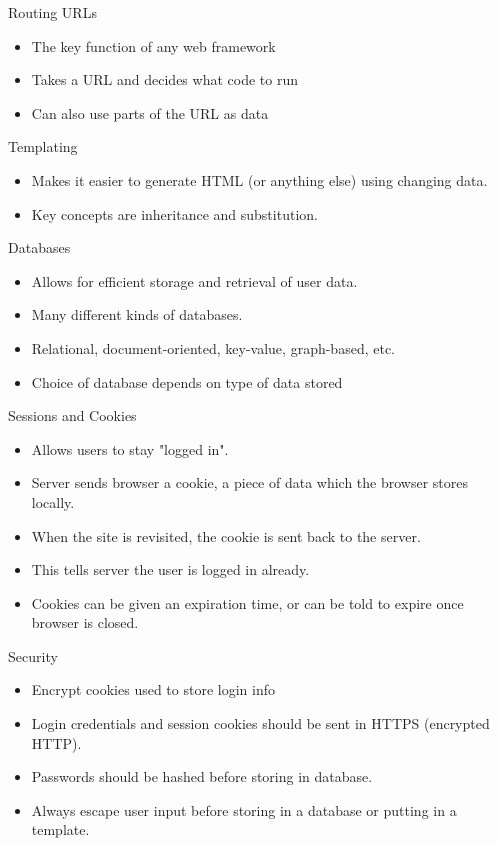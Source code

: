 \documentclass{beamer}
\begin{document}
\begin{frame}{Routing URLs}
	\begin{itemize}
		\item The key function of any web framework
		\item Takes a URL and decides what code to run
		\item Can also use parts of the URL as data
	\end{itemize}
\end{frame}

\begin{frame}{Templating}
	\begin{itemize}
		\item Makes it easier to generate HTML (or anything else) using
			changing data.
		\item Key concepts are inheritance and substitution.
	\end{itemize}
\end{frame}

\begin{frame}{Databases}
	\begin{itemize}
		\item Allows for efficient storage and retrieval of user data.
		\item Many different kinds of databases.
		\item Relational, document-oriented, key-value, graph-based, etc.
		\item Choice of database depends on type of data stored
	\end{itemize}
\end{frame}

\begin{frame}{Sessions and Cookies}
	\begin{itemize}
		\item Allows users to stay "logged in".
		\item Server sends browser a cookie, a piece of data which the browser
			stores locally.
		\item When the site is revisited, the cookie is sent back to the server.
		\item This tells server the user is logged in already.
		\item Cookies can be given an expiration time, or can be told to
			expire once browser is closed.
	\end{itemize}
\end{frame}

\begin{frame}{Security}
	\begin{itemize}
		\item Encrypt cookies used to store login info
		\item Login credentials and session cookies should be sent in 
			HTTPS (encrypted HTTP).
		\item Passwords should be hashed before storing in database.
		\item Always escape user input before storing in a database or
			putting in a template.
	\end{itemize}
\end{frame}
\end{document}
